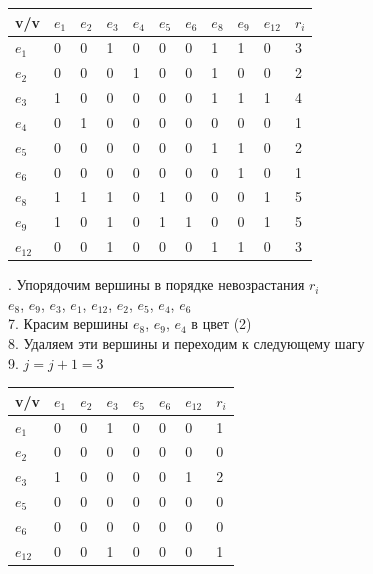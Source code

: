 \documentclass[a4paper,12pt]{article}
\begin{document}
\begin{table}[H]
    \centering
    \begin{tabular}{|l|l|l|l|l|l|l|l|l|l|l|}
    \hline
        v/v & $e_1$ & $e_2$ & $e_3$ & $e_4$ & $e_5$ & $e_6$ & $e_8$ & $e_9$ & $e_{12}$ & $r_i$ \\ \hline
        $e_1$ & 0 & 0 & 1 & 0 & 0 & 0 & 1 & 1 & 0 & 3 \\ \hline
        $e_2$ & 0 & 0 & 0 & 1 & 0 & 0 & 1 & 0 & 0 & 2 \\ \hline
        $e_3$ & 1 & 0 & 0 & 0 & 0 & 0 & 1 & 1 & 1 & 4 \\ \hline
        $e_4$ & 0 & 1 & 0 & 0 & 0 & 0 & 0 & 0 & 0 & 1 \\ \hline
        $e_5$ & 0 & 0 & 0 & 0 & 0 & 0 & 1 & 1 & 0 & 2 \\ \hline
        $e_6$ & 0 & 0 & 0 & 0 & 0 & 0 & 0 & 1 & 0 & 1 \\ \hline
        $e_8$ & 1 & 1 & 1 & 0 & 1 & 0 & 0 & 0 & 1 & 5 \\ \hline
        $e_9$ & 1 & 0 & 1 & 0 & 1 & 1 & 0 & 0 & 1 & 5 \\ \hline
        $e_{12}$ & 0 & 0 & 1 & 0 & 0 & 0 & 1 & 1 & 0 & 3 \\ \hline
    \end{tabular}
\end{table}
. Упорядочим вершины в порядке невозрастания $r_i$ \\
$e_8$, $e_9$, $e_3$, $e_1$, $e_{12}$, $e_2$, $e_5$, $e_4$, $e_6$ \\
7. Красим вершины $e_8$, $e_9$, $e_4$ в цвет (2) \\
8. Удаляем эти вершины и переходим к следующему шагу \\
9. $j = j + 1 = 3$ \\
\begin{table}[H]
    \centering
    \begin{tabular}{|l|l|l|l|l|l|l|l|}
    \hline
        v/v & $e_1$ & $e_2$ & $e_3$ & $e_5$ & $e_6$ & $e_{12}$ & $r_i$ \\ \hline
        $e_1$ & 0 & 0 & 1 & 0 & 0 & 0 & 1 \\ \hline
        $e_2$ & 0 & 0 & 0 & 0 & 0 & 0 & 0 \\ \hline
        $e_3$ & 1 & 0 & 0 & 0 & 0 & 1 & 2 \\ \hline
        $e_5$ & 0 & 0 & 0 & 0 & 0 & 0 & 0 \\ \hline
        $e_6$ & 0 & 0 & 0 & 0 & 0 & 0 & 0 \\ \hline
        $e_{12}$ & 0 & 0 & 1 & 0 & 0 & 0 & 1 \\ \hline
    \end{tabular}
\end{table}
\end{document}
